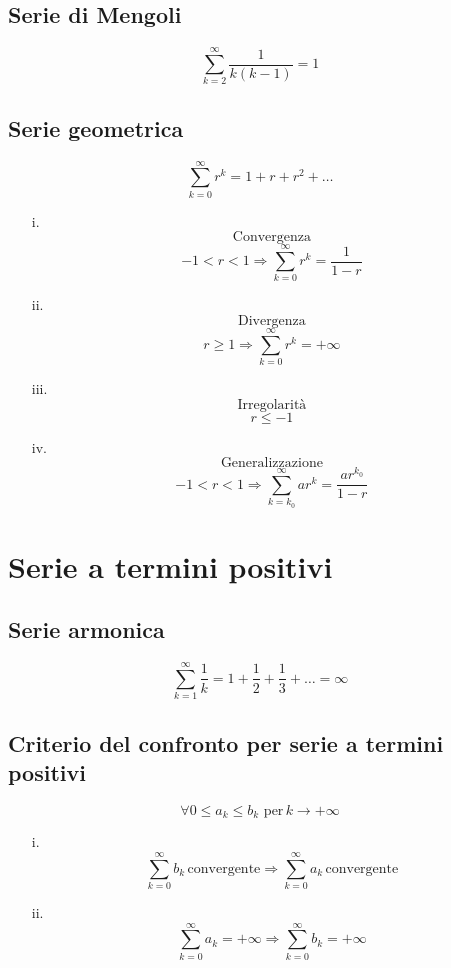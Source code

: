 \documentclass[a4paper,12pt]{report}
\theoremstyle{mystyle}
\begin{document}
\subsection{Serie di Mengoli}
\[\sum_{k=2}^\infty \frac{1}{k(k-1)} = 1 \]


\subsection{Serie geometrica}
\[\sum_{k=0}^\infty r^k = 1 + r + r^2 +\ldots \]

\begin{enumerate}
    \item[i.] \[\text{Convergenza}\]
        \[-1 < r < 1 \Rightarrow \sum_{k=0}^\infty r^k = \frac{1}{1-r} \]

    \item[ii.] \[\text{Divergenza}\]
        \[r \geq 1 \Rightarrow \sum_{k=0}^\infty r^k = +\infty \]

    \item[iii.] \[\text{Irregolarità}\]
        \[r \leq -1 \]

    \item[iv.] \[\text{Generalizzazione}\]
        \[-1 < r < 1 \Rightarrow \sum_{k=k_0}^\infty a r^k = \frac{a r^{k_0}}{1-r} \]
\end{enumerate}


\section{Serie a termini positivi}

\subsection{Serie armonica}
\[\sum_{k=1}^\infty \frac{1}{k} = 1 + \frac{1}{2}+ \frac{1}{3} + \ldots = \infty\]

\subsection{Criterio del confronto per serie a termini positivi}
\[\forall 0 \leq a_k \leq b_k  \text{ per} \, k \rightarrow + \infty \]
\begin{enumerate}
    \item[i.] \[\sum_{k=0}^\infty b_k \, \text{convergente} \Rightarrow \sum_{k=0}^\infty a_k \, \text{convergente} \]

    \item[ii.] \[\sum_{k=0}^\infty a_k = + \infty \Rightarrow \sum_{k=0}^\infty b_k = + \infty \]
\end{enumerate}
\end{document}
